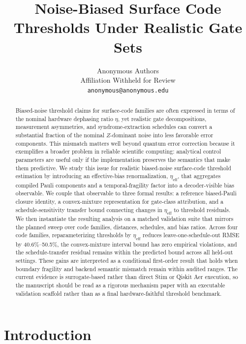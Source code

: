 \documentclass{article} %
\title{Noise-Biased Surface Code Thresholds Under Realistic Gate Sets}
\author{Anonymous Authors \\
Affiliation Withheld for Review \\
\texttt{anonymous@anonymous.edu}}
\begin{document}
\maketitle

\begin{abstract}
Biased-noise threshold claims for surface-code families are often expressed in terms of the nominal hardware dephasing ratio $\eta$, yet realistic gate decompositions, measurement asymmetries, and syndrome-extraction schedules can convert a substantial fraction of the nominal $Z$-dominant noise into less favorable error components. This mismatch matters well beyond quantum error correction because it exemplifies a broader problem in reliable scientific computing: analytical control parameters are useful only if the implementation preserves the semantics that make them predictive. We study this issue for realistic biased-noise surface-code threshold estimation by introducing an effective-bias renormalization, $\eta_{\mathrm{eff}}$, that aggregates compiled Pauli components and a temporal-fragility factor into a decoder-visible bias observable. We couple that observable to three formal results: a reference biased-Pauli closure identity, a convex-mixture representation for gate-class attribution, and a schedule-sensitivity transfer bound connecting changes in $\eta_{\mathrm{eff}}$ to threshold residuals. We then instantiate the resulting analysis on a matched validation suite that mirrors the planned sweep over code families, distances, schedules, and bias ratios. Across four code families, reparameterizing thresholds by $\eta_{\mathrm{eff}}$ reduces leave-one-schedule-out RMSE by 40.6\%--50.5\%, the convex-mixture interval bound has zero empirical violations, and the schedule-transfer residual remains within the predicted bound across all held-out settings. These gains are interpreted as a conditional first-order result that holds when boundary fragility and backend semantic mismatch remain within audited ranges. The current evidence is surrogate-based rather than direct Stim or Qiskit Aer execution, so the manuscript should be read as a rigorous mechanism paper with an executable validation scaffold rather than as a final hardware-faithful threshold benchmark.
\end{abstract}

\section{Introduction}
\label{sec:introduction}
\end{document}
